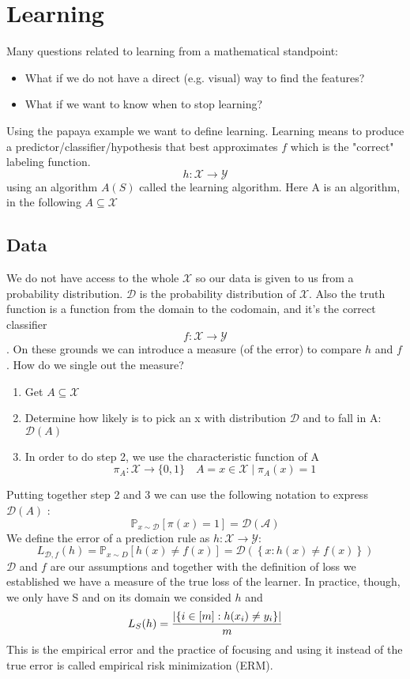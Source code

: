 \section{Learning}
Many questions related to learning from a mathematical standpoint:
\begin{itemize}
    \item What if we do not have a direct (e.g. visual) way to find the features?
    \item What if we want to know when to stop learning?
\end{itemize}
Using the papaya example we want to define learning. Learning means to produce a predictor/classifier/hypothesis that best approximates $f$ which is the "correct" labeling function. 
\[ 
    h: \mathcal{X} \longrightarrow \mathcal{Y}
\]using an algorithm $A(S)$ called the learning algorithm.
Here A is an algorithm, in the following $A\subseteq \mathcal{X}$
\subsection{Data}
We do not have access to the whole $\mathcal{X}$ so our data is given to us from a probability distribution. $\mathcal{D}$ is the probability distribution of $\mathcal{X}$. Also the truth function is a function from the domain to the codomain, and it's the correct classifier
\[ 
    f: \mathcal{X} \longrightarrow \mathcal{Y} 
\].
On these grounds we can introduce a measure (of the error) to compare $h$ and $f$. How do we single out the measure? 
\begin{enumerate}
    \item Get $A \subseteq \mathcal{X}$
    \item Determine how likely is to pick an x with distribution $\mathcal{D}$ and to fall in A: $\mathcal{D}(A)$
    \item In order to do step 2, we use the characteristic function of A
    \[ 
        \pi_A : \mathcal{X} \longrightarrow \{0,1\}\quad A = {x\in \mathcal{X}\mid \pi_A(x)=1} 
    \]
\end{enumerate}
Putting together step 2 and 3 we can use the following notation to express $\mathcal{D}(A)$ :
\[ 
    \mathbb{P}_{x\sim\mathcal{D}}[\pi(x)=1] = \mathcal{D(A)} 
\]
We define the error of a prediction rule as $h: \mathcal{X}\longrightarrow \mathcal{Y}$:
\[ 
    L_{\mathcal{D},f}(h)= \mathbb{P}_{x\sim D}[h(x)\neq f(x)]=\mathcal{D}(\left\{ x: h(x) \neq f(x) \right\}) 
\]$\mathcal{D} $ and $f$ are our assumptions and together with the definition of loss we established we have a measure of the true loss of the learner. In practice, though, we only have S and on its domain we consided $h$ and 
\[ 
    L_S(h) = \frac{\left\lvert\left\{ i \in[m]: h(x_i) \neq y_i \right\}\right\rvert}{m} 
\]
This is the empirical error and the practice of focusing and using it instead of the true error is called empirical risk minimization (ERM).

